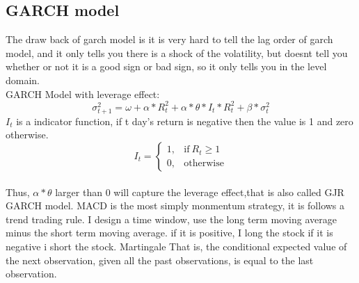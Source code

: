 \documentclass[a4paper,11pt]{article}
\begin{document}
\subsection{GARCH model}
The draw back of garch model is it is very hard to tell the lag order of garch model, and it only tells you there is a shock of the volatility, but doesnt tell you whether or not it is a good sign or bad sign, so it only tells you in the level domain.\\
GARCH Model with leverage effect:
\begin{equation}
\sigma^2_{t+1}=\omega+\alpha*R_t^2+\alpha*\theta*I_t*R_t^2+\beta*\sigma_t^2
\end{equation}
$I_t$ is a indicator function, if t day's return is negative then the value is 1 and zero otherwise.
\begin{equation}
    I_t=
    \begin{cases}
      1, & \text{if}\ R_t \geq 1 \\
      0, & \text{otherwise}
    \end{cases}
  \end{equation}\\
Thus, $\alpha*\theta$ larger than 0 will capture the leverage effect,that is also called GJR GARCH model.
MACD is the most simply monmentum strategy, it is follows a trend trading rule. I design a time window, use the long term moving average minus the short term moving average. if it is positive, I long the stock if it is negative i short the stock.
Martingale That is, the conditional expected value of the next observation, given all the past observations, is equal to the last observation. \\

\end{document}
